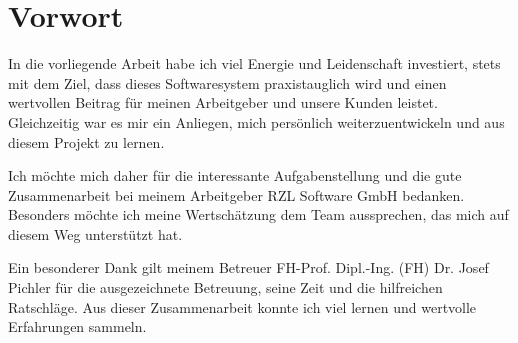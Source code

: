\chapter{Vorwort}
In die vorliegende Arbeit habe ich viel Energie und Leidenschaft investiert, stets mit dem Ziel, dass dieses Softwaresystem praxistauglich wird und einen wertvollen Beitrag für meinen Arbeitgeber und unsere Kunden leistet. Gleichzeitig war es mir ein Anliegen, mich persönlich weiterzuentwickeln und aus diesem Projekt zu lernen.

Ich möchte mich daher für die interessante Aufgabenstellung und die gute Zusammenarbeit bei meinem Arbeitgeber RZL Software GmbH bedanken. Besonders möchte ich meine Wertschätzung dem Team aussprechen, das mich auf diesem Weg unterstützt hat.

Ein besonderer Dank gilt meinem Betreuer FH-Prof. Dipl.-Ing. (FH) Dr. Josef Pichler für die ausgezeichnete Betreuung, seine Zeit und die hilfreichen Ratschläge. Aus dieser Zusammenarbeit konnte ich viel lernen und wertvolle Erfahrungen sammeln.

